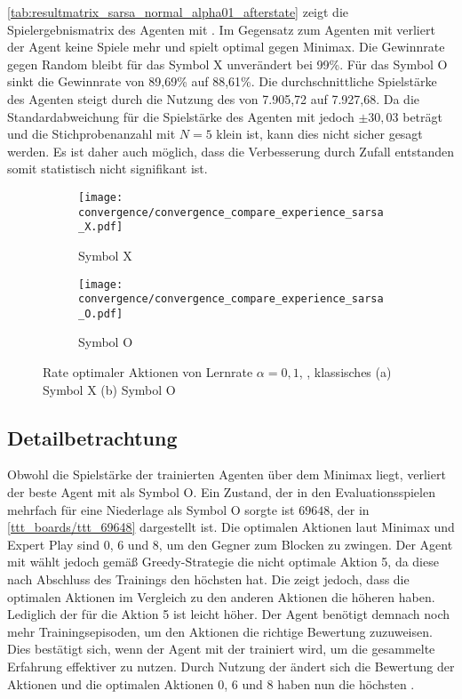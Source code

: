 \cref{tab:resultmatrix_sarsa_normal_alpha01_afterstate} zeigt die Spielergebnismatrix des \sarsa Agenten mit \wtable. 
Im Gegensatz zum Agenten mit \qtable verliert der Agent keine Spiele mehr und spielt optimal gegen Minimax. 
Die Gewinnrate gegen Random bleibt für das Symbol X unverändert bei 99\%. 
Für das Symbol O sinkt die Gewinnrate von 89,69\% auf 88,61\%. 
Die durchschnittliche Spielstärke des Agenten steigt durch die Nutzung des \wtable von 7.905,72 auf 7.927,68.
Da die Standardabweichung für die Spielstärke des Agenten mit \qtable jedoch $\pm 30,03$ beträgt und die Stichprobenanzahl mit $N=5$ klein ist, kann dies nicht sicher gesagt werden.
Es ist daher auch möglich, dass die Verbesserung durch Zufall entstanden somit statistisch nicht signifikant ist.

\begin{figure}
\centering
\begin{subfigure}[b]{0.75\textwidth}
    \centering
   \texttt{[image: convergence/convergence\_compare\_experience\_sarsa\_X.pdf]}
   \caption{Symbol X}
   \label{fig:convergence_compare_experience_sarsa_X} 
\end{subfigure}

\begin{subfigure}[b]{0.75\textwidth}
    \centering
   \texttt{[image: convergence/convergence\_compare\_experience\_sarsa\_O.pdf]}
   \caption{Symbol O}
   \label{fig:convergence_compare_experience_sarsa_O}
\end{subfigure}
\caption[Rate optimaler Aktionen bester \sarsa Agent, \wtable, klassisches \splay]{Rate optimaler Aktionen von \sarsa Lernrate $\alpha=0,1$, \wtable, klassisches \splay (a) Symbol X (b) Symbol O}
\label{fig:convergence_compare_experience_sarsa}
\end{figure}



\subsection{Detailbetrachtung}
Obwohl die Spielstärke der trainierten \sarsa Agenten über dem Minimax liegt, verliert der beste Agent mit \qtable als Symbol O. 
Ein Zustand, der in den Evaluationsspielen mehrfach für eine Niederlage als Symbol O sorgte ist $69648$, der in \cref{ttt_boards/ttt_69648} dargestellt ist. 
Die optimalen Aktionen laut Minimax und Expert Play sind 0, 6 und 8, um den Gegner zum Blocken zu zwingen. 
Der Agent mit \qtable wählt jedoch gemäß Greedy-Strategie die nicht optimale Aktion 5, da diese nach Abschluss des Trainings den höchsten \qValue hat. 
Die \qtable zeigt jedoch, dass die optimalen Aktionen im Vergleich zu den anderen Aktionen die höheren \qValues haben. 
Lediglich der \qValue für die Aktion 5 ist leicht höher. 
Der Agent benötigt demnach noch mehr Trainingsepisoden, um den Aktionen die richtige Bewertung zuzuweisen. 
Dies bestätigt sich, wenn der \sarsa Agent mit der \wtable trainiert wird, um die gesammelte Erfahrung effektiver zu nutzen.  
Durch Nutzung der \wtable ändert sich die Bewertung der Aktionen und die optimalen Aktionen 0, 6 und 8 haben nun die höchsten \qValues.

